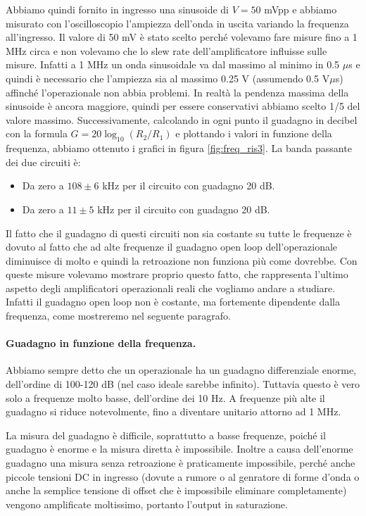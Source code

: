 Abbiamo quindi fornito in ingresso una sinusoide di $V = 50$ mVpp e abbiamo misurato con
l'oscilloscopio l'ampiezza dell'onda in uscita variando la frequenza all'ingresso.
Il valore di 50 mV è stato scelto perché volevamo fare misure fino a 1 MHz circa e non volevamo
che lo slew rate dell'amplificatore influisse sulle misure. Infatti a 1 MHz un onda sinusoidale
va dal massimo al minimo in 0.5 $\mu$s e quindi è necessario che l'ampiezza sia al massimo 0.25 V (assumendo 0.5 V$\mu$s)
affinché l'operazionale non abbia problemi. In realtà la pendenza massima della sinusoide è ancora maggiore,
quindi per essere conservativi abbiamo scelto 1/5 del valore massimo. Successivamente,
calcolando in ogni punto il guadagno in decibel con la formula $G = 20\log_{10}(R_2/R_1)$
e plottando i valori in funzione della frequenza, abbiamo ottenuto i grafici in figura \ref{fig:freq_ris3}.
La banda passante dei due circuiti è:

\begin{itemize}
    \item{Da zero a $108 \pm 6$ kHz per il circuito con guadagno 20 dB.}
    \item{Da zero a $11 \pm 5$ kHz per il circuito con guadagno 20 dB.}
\end{itemize}

Il fatto che il guadagno di questi circuiti non sia costante su tutte le frequenze è dovuto al fatto che ad alte frequenze
il guadagno open loop dell'operazionale diminuisce di molto e quindi la retroazione non funziona più come dovrebbe.
Con queste misure volevamo mostrare proprio questo fatto, che rappresenta l'ultimo aspetto degli amplificatori
operazionali reali che vogliamo andare a studiare. Infatti il guadagno open loop non è costante, ma fortemente dipendente
dalla frequenza, come mostreremo nel seguente paragrafo.

\paragraph{Guadagno in funzione della frequenza.}

Abbiamo sempre detto che un operazionale ha un guadagno differenziale enorme, dell'ordine di 100-120 dB
(nel caso ideale sarebbe infinito). Tuttavia questo è vero solo a frequenze molto basse, dell'ordine dei
10 Hz. A frequenze più alte il guadagno si riduce notevolmente, fino a diventare unitario attorno ad 1 MHz.

La misura del guadagno è difficile, soprattutto a basse frequenze, poiché il guadagno è enorme e la misura
diretta è impossibile. Inoltre a causa dell'enorme guadagno una misura senza retroazione è praticamente
impossibile, perché anche piccole tensioni DC in ingresso (dovute a rumore o al genratore di forme d'onda o anche la semplice
tensione di offset che è impossibile eliminare completamente)
vengono amplificate moltissimo, portanto l'output in saturazione.

